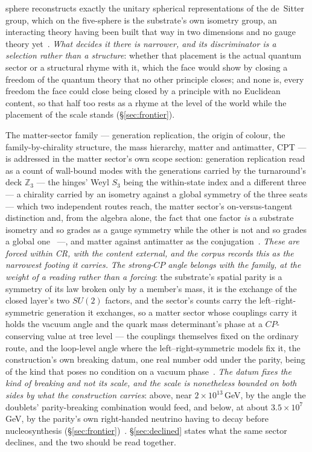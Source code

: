\documentclass[11pt,a4paper]{article}
\theoremstyle{plain}
\theoremstyle{definition}
\begin{document}
sphere reconstructs exactly the unitary spherical representations of the de~Sitter group, which on the five-sphere is the
substrate's own isometry group, an interacting theory having been built that way in two dimensions and no gauge theory
yet~\cite{JanzenBoundary}. \emph{What decides
it there is narrower, and its discriminator is a selection rather than a structure}: whether that placement is the
actual quantum sector or a structural rhyme with it, which the face would show by closing a freedom of the quantum
theory that no other principle closes; and none is, every freedom the face could close being closed by a principle
with no Euclidean content, so that half too rests as a rhyme at the level of the world while the placement of the
scale stands (\S\ref{sec:frontier}).

The matter-sector family --- generation replication, the origin of colour, the family-by-chirality structure,
the mass hierarchy, matter and antimatter, CPT --- is addressed in the matter sector's own scope section:
generation replication read as a count of wall-bound modes with the generations carried by the turnaround's
deck $\mathbb{Z}_3$ --- the hinges' Weyl $S_3$ being the within-state index and a different three --- a chirality carried by an isometry against a global symmetry of the three seats --- which two independent routes reach, the matter sector's
on-versus-tangent distinction and, from the algebra alone, the fact that one factor \emph{is} a substrate
isometry and so grades as a gauge symmetry while the other is not and so grades a global
one~\cite{JanzenGroupoid,JanzenAlgebroid} ---, and matter against antimatter
as the conjugation~\cite{JanzenMatter}. \emph{These are forced within CR, with the content external, and the corpus records this as the narrowest
footing it carries.} \emph{The strong-$CP$ angle belongs with the family, at the weight of a reading rather than a
forcing}: the substrate's spatial parity is a symmetry of its law broken only by a member's mass, it is the
exchange of the closed layer's two $SU(2)$ factors, and the sector's counts carry the left--right-symmetric
generation it exchanges, so a matter sector whose couplings carry it holds the vacuum angle and the quark mass
determinant's phase at a $CP$-conserving value at tree level --- the couplings themselves fixed on the ordinary
route, and the loop-level angle where the left--right-symmetric models fix it,
the construction's own breaking datum, one real number odd under the parity, being of the kind that poses no
condition on a vacuum phase~\cite{JanzenMatter,JanzenBoundary}. \emph{The datum fixes the kind of breaking and not
its scale, and the scale is nonetheless bounded on both sides by what the construction carries}: above, near
$2\times10^{13}$\,GeV, by the angle the doublets' parity-breaking combination would feed, and below, at about
$3.5\times10^{7}$\,GeV, by the parity's own right-handed neutrino having to decay before nucleosynthesis
(\S\ref{sec:frontier})~\cite{JanzenMatter,JanzenCRcosmology}. \S\ref{sec:declined}
states what the same sector declines, and the two should be read together.
\end{document}
